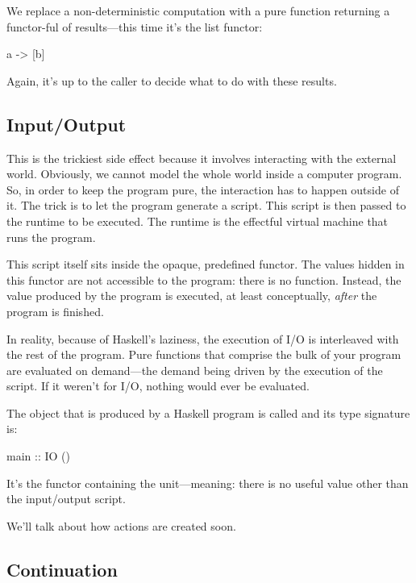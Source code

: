 \documentclass[DaoFP]{subfiles}
\begin{document}
We replace a non-deterministic computation  with a pure function returning a functor-ful of results---this time it's the list functor:
\begin{haskell}
a -> [b]
\end{haskell}
Again, it's up to the caller to decide what to do with these results.

\subsection{Input/Output}

This is the trickiest side effect because it involves interacting with the external world. Obviously, we cannot model the whole world inside a computer program. So, in order to keep the program pure, the interaction has to happen outside of it. The trick is to let the program generate a script. This script is then passed to the runtime to be executed. The runtime is the effectful virtual machine that runs the program. 

This script itself sits inside the opaque, predefined  functor. The values hidden in this functor are not accessible to the program: there is no  function. Instead, the  value produced by the program is executed, at least conceptually, \emph{after} the program is finished. 

In reality, because of Haskell's laziness, the execution of I/O is interleaved with the rest of the program.  Pure functions that comprise the bulk of your program are evaluated on demand---the demand being driven by the execution of the  script. If it weren't for I/O, nothing would ever be evaluated.

The  object that is produced by a Haskell program is called  and its type signature is:
\begin{haskell}
main :: IO ()
\end{haskell}
It's the  functor containing the unit---meaning: there is no useful value other than the input/output script.

We'll talk about how  actions are created soon.

\subsection{Continuation}
\end{document}

